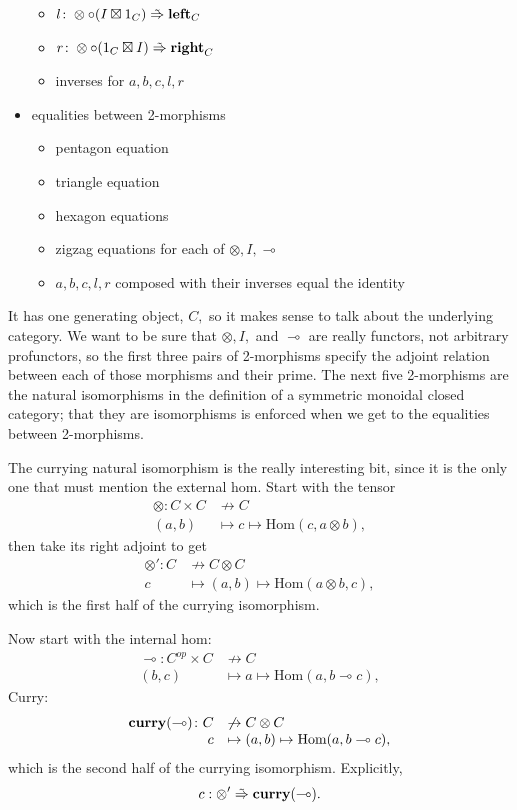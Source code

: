 \documentclass[12pt,twoside,openright]{report}
\newcommand{\maps}{\colon}
\newcommand{\lhom}{\multimap}
\newcommand{\tensor}{\otimes}
\newcommand{\mbold}[1]{\mbox{\bf #1}}
\newcommand{\isotoo}{\; \tilde{\Rightarrow} \;}
\newcommand{\Hom}{\mbox{Hom}}
\begin{document}
\begin{itemize}
\begin{itemize}
    \item $l\maps \tensor \circ (I \boxtimes 1_C) \isotoo \mbold{left}_C$
    \item $r\maps \tensor \circ (1_C \boxtimes I) \isotoo \mbold{right}_C$
    \item inverses for $a,b,c,l,r$
  \end{itemize}
  \item equalities between 2-morphisms
  \begin{itemize}
    \item pentagon equation
    \item triangle equation
    \item hexagon equations
    \item zigzag equations for each of $\tensor, I, \lhom$
    \item $a,b,c,l,r$ composed with their inverses equal the identity
  \end{itemize}
\end{itemize}

It has one generating object, $C,$ so it makes sense to talk about the underlying category.  We want to be sure that $\tensor, I,$ and $\lhom$ are really functors, not arbitrary profunctors, so the first three pairs of 2-morphisms specify the adjoint relation between each of those morphisms and their prime.  The next five 2-morphisms are the natural isomorphisms in the definition of a symmetric monoidal closed category; that they are isomorphisms is enforced when we get to the equalities between 2-morphisms.

The currying natural isomorphism is the really interesting bit, since it is the only one that must mention the external hom.  Start with the tensor
\[ \begin{array}{rl}\tensor\maps C \times C &\not\to C \\ (a,b) &\mapsto c \mapsto \Hom(c, a \tensor b),\end{array} \]
then take its right adjoint to get
\[ \begin{array}{rl}\tensor'\maps C & \not\to C \otimes C \\ c & \mapsto (a, b) \mapsto \Hom(a \tensor b, c),\end{array} \]
which is the first half of the currying isomorphism.

Now start with the internal hom:
\[ \begin{array}{rl}\lhom\maps C^{op} \times C &\not\to C \\ (b,c) &\mapsto a \mapsto \Hom(a, b \lhom c),\end{array} \]
Curry:
\[ \begin{array}{rl}\mbold{curry}(\lhom)\maps C &\not\to C \otimes C \\ c &\mapsto (a, b) \mapsto \Hom(a, b \lhom c),\end{array} \]
which is the second half of the currying isomorphism.  Explicitly,
\[ c:\tensor' \isotoo \mbold{curry}(\lhom). \]
\end{document}
